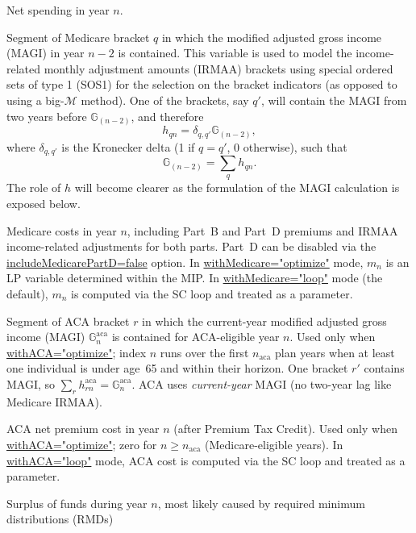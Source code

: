 \documentclass[fleqn,12pt]{report}
\newcommand{\code}[1]{\url{#1}}
\begin{document}
\begin{description}[leftmargin=4em,style=multiline]
\item [$g_n$]
	Net spending in year $n$.
\item [$h_{qn}$]
	Segment of Medicare bracket $q$ in which the modified adjusted gross income (MAGI) in year $n-2$ is contained.
	This variable is used to model the income-related monthly adjustment amounts
	(IRMAA) brackets using special ordered sets of type 1 (SOS1) for the selection on the bracket indicators
	(as opposed to using a big-$\mathcal{M}$ method). One of the brackets, say $q'$, will contain
	the MAGI from two years before $\mathbb{G}_{(n-2)}$, and therefore
	\begin{equation}
		h_{qn} = \delta_{q,q'} \mathbb{G}_{(n-2)},
	\end{equation}
	where $\delta_{q,q'}$ is the Kronecker delta (1 if $q=q'$, 0 otherwise), such that
	\begin{equation}
		\mathbb{G}_{(n-2)} = \sum_q h_{qn}.
	\end{equation}
	The role of $h$ will become clearer as the formulation of the MAGI calculation is exposed below.
\item [$m_n$]
	Medicare costs in year $n$, including Part~B and Part~D premiums and IRMAA income-related
	adjustments for both parts.
	Part~D can be disabled via the \code{includeMedicarePartD=false} option.
	In \code{withMedicare="optimize"} mode, $m_n$ is an LP variable determined within the MIP.
	In \code{withMedicare="loop"} mode (the default), $m_n$ is computed via the SC loop and treated as a parameter.
\item [$h^{\mathrm{aca}}_{rn}$]
	Segment of ACA bracket $r$ in which the current-year modified adjusted gross income (MAGI)
	$\mathbb{G}^{\mathrm{aca}}_n$ is contained for ACA-eligible year $n$.
	Used only when \code{withACA="optimize"}; index $n$ runs over the first $n_{\mathrm{aca}}$
	plan years when at least one individual is under age~65 and within their horizon.
	One bracket $r'$ contains MAGI, so $\sum_r h^{\mathrm{aca}}_{rn} = \mathbb{G}^{\mathrm{aca}}_n$.
	ACA uses \emph{current-year} MAGI (no two-year lag like Medicare IRMAA).
\item [$m^{\mathrm{aca}}_n$]
	ACA net premium cost in year $n$ (after Premium Tax Credit).
	Used only when \code{withACA="optimize"}; zero for $n \ge n_{\mathrm{aca}}$ (Medicare-eligible years).
	In \code{withACA="loop"} mode, ACA cost is computed via the SC loop and treated as a parameter.
\item [$s_{n}$]
	Surplus of funds during year $n$, most likely caused by required minimum distributions (RMDs)

\end{description}
\end{document}
